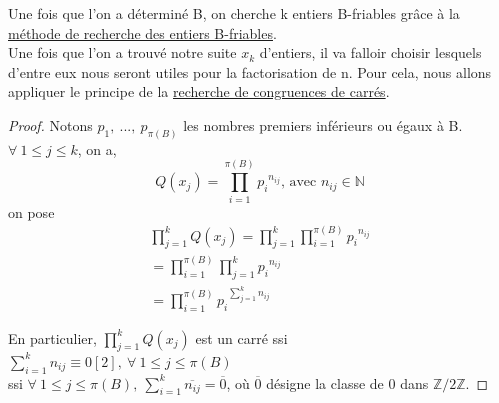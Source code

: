 Une fois que l'on a déterminé B, on cherche k entiers B-friables grâce à la \hyperref[B-friabilite]{méthode de recherche des entiers B-friables}.\\

Une fois que l'on a trouvé notre suite $x_k$ d'entiers, il va falloir choisir lesquels d'entre eux nous seront utiles pour la factorisation de n. Pour cela, nous allons appliquer le principe de la \hyperref[Matrices]{recherche de congruences de carrés}.\\

\begin{proof}
    Notons $p_1, ~ ..., ~ p_{\pi(B)}$ les nombres premiers inférieurs ou égaux à B.\\
    $\forall ~ 1 \leq j \leq k$, on a,
    \[Q(x_j) = \prod\limits_{i=1}^{\pi(B)} {p_i}^{n_{ij}} \textrm{, avec } n_{ij} \in \mathbb{N}\]
    on pose
    \begin{align*}
        \prod\limits_{j=1}^{k} Q(x_j) = \prod\limits_{j=1}^k {\prod\limits_{i=1}^{\pi(B)} {p_i}^{n_{ij}}}\\
        = \prod\limits_{i=1}^{\pi(B)} {{\prod\limits_{j=1}^k {p_i}^{n_{ij}}}}\\
        = \prod\limits_{i=1}^{\pi(B)} {{p_i}^{\sum\limits_{j=1}^k {n_{ij}}}}
    \end{align*}
 
    En particulier, $\prod\limits_{j=1}^{k} Q(x_j)$ est un carré ssi $\sum\limits_{i=1}^k {n_{ij}} \equiv 0 [2], ~ \forall ~ 1 \leq j \leq \pi(B)$\\
    
    ssi $\forall ~ 1 \leq j \leq \pi(B), ~ \sum\limits_{i=1}^k {\overline{n_{ij}}} = \overline{0}$, où $\overline{0}$ désigne la classe de 0 dans $\mathbb{Z}/2\mathbb{Z}$.
    

\end{proof}
